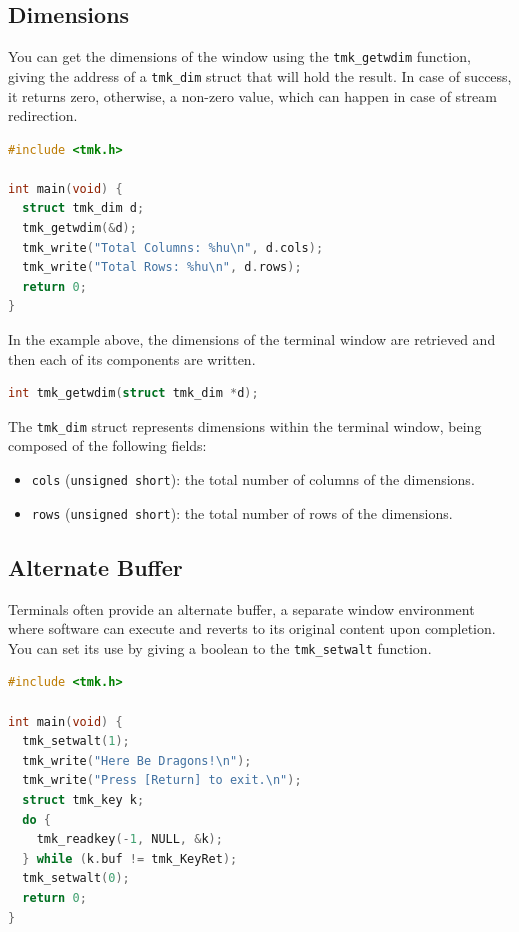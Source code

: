 \documentclass{report}
\begin{document}
\subsection{Dimensions}
You can get the dimensions of the window using the \texttt{tmk\_getwdim} function, giving the address of a \texttt{tmk\_dim} struct that will hold the result. In case of success, it returns zero, otherwise, a non-zero value, which can happen in case of stream redirection.
\begin{lstlisting}[language=c,caption=an example that gets the terminal window dimensions.]
#include <tmk.h>

int main(void) {
  struct tmk_dim d;
  tmk_getwdim(&d);
  tmk_write("Total Columns: %hu\n", d.cols);
  tmk_write("Total Rows: %hu\n", d.rows);
  return 0;
}
\end{lstlisting}

In the example above, the dimensions of the terminal window are retrieved and then each of its components are written.
\begin{lstlisting}[language=c,caption=the declaration of the \texttt{tmk\_getwdim} function.]
int tmk_getwdim(struct tmk_dim *d);
\end{lstlisting}

The \texttt{tmk\_dim} struct represents dimensions within the terminal window, being composed of the following fields:
\begin{itemize}
  \item \texttt{cols} (\texttt{unsigned short}): the total number of columns of the dimensions.
  \item \texttt{rows} (\texttt{unsigned short}): the total number of rows of the dimensions.
\end{itemize}
\subsection{Alternate Buffer}
Terminals often provide an alternate buffer, a separate window environment where software can execute and reverts to its original content upon completion. You can set its use by giving a boolean to the \texttt{tmk\_setwalt} function.
\begin{lstlisting}[language=c,caption=an example that shows an usage for the alternate buffer.]
#include <tmk.h>

int main(void) {
  tmk_setwalt(1);
  tmk_write("Here Be Dragons!\n");
  tmk_write("Press [Return] to exit.\n");
  struct tmk_key k;
  do {
    tmk_readkey(-1, NULL, &k);
  } while (k.buf != tmk_KeyRet);
  tmk_setwalt(0);
  return 0;
}
\end{lstlisting}
\end{document}

